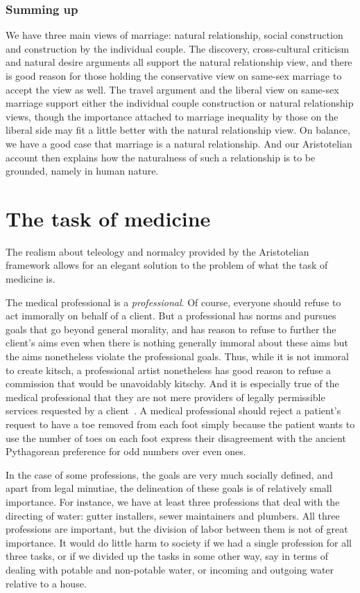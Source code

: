 \subsubsection{Summing up}
We have three main views of marriage: natural relationship, social construction and construction by the individual couple. 
The discovery, cross-cultural criticism and natural desire arguments all support the natural relationship view, and 
there is good reason for those holding the conservative view on same-sex marriage to accept the view as well. 
The travel argument and the liberal view on same-sex marriage support either the individual couple construction or 
natural relationship views, though the importance attached to marriage inequality by those on the liberal side may 
fit a little better with the natural relationship view. On balance, we have a good case that marriage is a natural
relationship. And our Aristotelian account then explains how the naturalness of such a relationship is to be grounded, 
namely in human nature. 

\section{The task of medicine}
The realism about teleology and normalcy provided by the Aristotelian framework
allows for an elegant solution to the problem of what the task of medicine is.

The medical professional is a \textit{professional}. Of course, everyone should refuse to act immorally on behalf of a client. But a professional has norms
and pursues goals that go beyond general morality, and has reason to refuse to further the client's aims even when there is nothing generally immoral about
these aims but the aims nonetheless violate the professional goals. Thus, while it is not immoral to create kitsch, a professional artist nonetheless has good reason
to refuse a commission that would be unavoidably kitschy. And it is especially true of the medical professional
that they are not mere providers of legally permissible services requested by a client~\parencite{CurlinTollefsen}.
A medical professional should reject a patient's request to have a toe removed from each foot simply because the patient
wants to use the number of toes on each foot express their disagreement with the ancient Pythagorean preference for odd numbers over even ones.

In the case of some professions, the goals are very much socially defined, and apart from legal minutiae, the delineation of these goals is of relatively
small importance. For instance, we have at least three professions that deal with the directing of water: gutter installers, sewer maintainers and plumbers.
All three professions are important, but the division of labor between them is not of great importance. It would do little harm to society if we had a single
profession for all three tasks, or if we divided up the tasks in some other way, say in terms of dealing with potable and non-potable water, or incoming
and outgoing water relative to a house.

